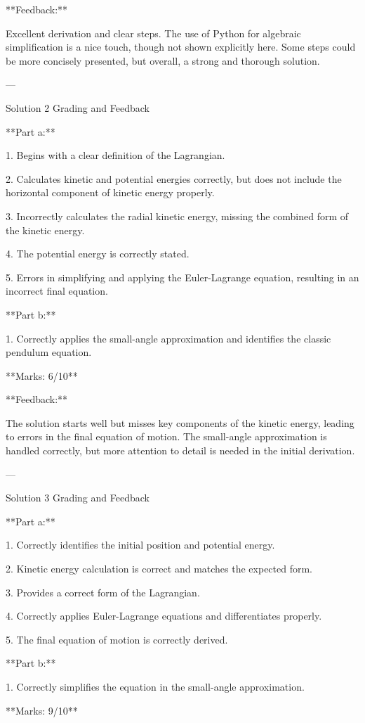 \documentclass[a4paper,11pt]{article}
\begin{document}
**Feedback:**

Excellent derivation and clear steps. The use of Python for algebraic simplification is a nice touch, though not shown explicitly here. Some steps could be more concisely presented, but overall, a strong and thorough solution.

---

Solution 2 Grading and Feedback

**Part a:**

1. Begins with a clear definition of the Lagrangian.

2. Calculates kinetic and potential energies correctly, but does not include the horizontal component of kinetic energy properly.

3. Incorrectly calculates the radial kinetic energy, missing the combined form of the kinetic energy.

4. The potential energy is correctly stated.

5. Errors in simplifying and applying the Euler-Lagrange equation, resulting in an incorrect final equation.

**Part b:**

1. Correctly applies the small-angle approximation and identifies the classic pendulum equation.

**Marks: 6/10**

**Feedback:**

The solution starts well but misses key components of the kinetic energy, leading to errors in the final equation of motion. The small-angle approximation is handled correctly, but more attention to detail is needed in the initial derivation.

---

Solution 3 Grading and Feedback

**Part a:**

1. Correctly identifies the initial position and potential energy.

2. Kinetic energy calculation is correct and matches the expected form.

3. Provides a correct form of the Lagrangian.

4. Correctly applies Euler-Lagrange equations and differentiates properly.

5. The final equation of motion is correctly derived.

**Part b:**

1. Correctly simplifies the equation in the small-angle approximation.

**Marks: 9/10**
\end{document}
